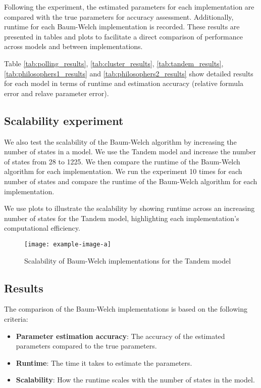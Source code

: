 Following the experiment, the estimated parameters for each implementation are compared with the true parameters for accuracy assessment. Additionally, runtime for each Baum-Welch implementation is recorded. These results are presented in tables and plots to facilitate a direct comparison of performance across models and between implementations.

Table \ref{tab:polling_results}, \ref{tab:cluster_results}, \ref{tab:tandem_results}, \ref{tab:philosophers1_results} and \ref{tab:philosophers2_results} show detailed results for each model in terms of runtime and estimation accuracy (relative formula error and relave parameter error). 



\subsection{Scalability experiment}
We also test the scalability of the Baum-Welch algorithm by increasing the number of states in a model. We use the Tandem model and increase the number of states from 28 to 1225. We then compare the runtime of the Baum-Welch algorithm for each implementation.
We run the experiment 10 times for each number of states and compare the runtime of the Baum-Welch algorithm for each implementation.

We use plots to illustrate the scalability by showing runtime across an increasing number of states for the Tandem model, highlighting each implementation's computational efficiency.

\begin{figure}
    \centering
    \texttt{[image: example-image-a]}
    \caption{Scalability of Baum-Welch implementations for the Tandem model}
    \label{fig:tandem_scalability}
\end{figure}

\subsection{Results}

The comparison of the Baum-Welch implementations is based on the following criteria:
\begin{itemize}
    \item \textbf{Parameter estimation accuracy}: The accuracy of the estimated parameters compared to the true parameters.
    \item \textbf{Runtime}: The time it takes to estimate the parameters.
    \item \textbf{Scalability}: How the runtime scales with the number of states in the model.
\end{itemize}

